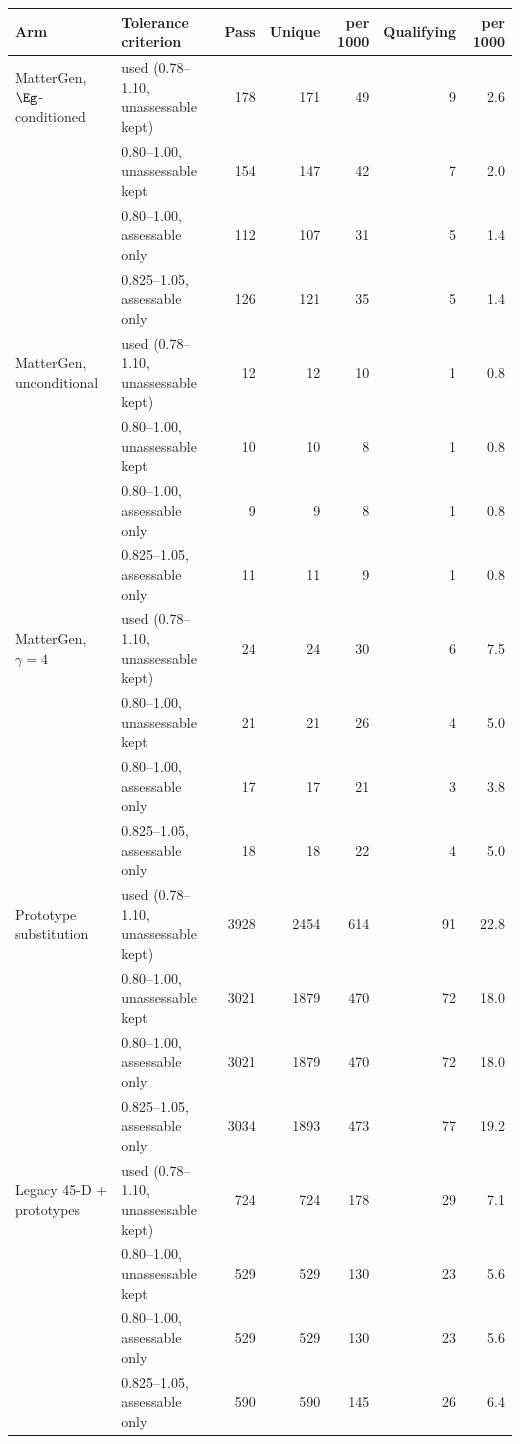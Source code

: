 \begin{tabular}{@{}llrrrrr@{}}\toprule
 Arm & Tolerance criterion & Pass & Unique & per 1000 & Qualifying & per 1000\\\midrule
MatterGen, $\Eg$-conditioned & used (0.78--1.10, unassessable kept) & 178 & 171 & 49 & 9 & 2.6 \\
 & 0.80--1.00, unassessable kept & 154 & 147 & 42 & 7 & 2.0 \\
 & 0.80--1.00, assessable only & 112 & 107 & 31 & 5 & 1.4 \\
 & 0.825--1.05, assessable only & 126 & 121 & 35 & 5 & 1.4 \\
\midrule
MatterGen, unconditional & used (0.78--1.10, unassessable kept) & 12 & 12 & 10 & 1 & 0.8 \\
 & 0.80--1.00, unassessable kept & 10 & 10 & 8 & 1 & 0.8 \\
 & 0.80--1.00, assessable only & 9 & 9 & 8 & 1 & 0.8 \\
 & 0.825--1.05, assessable only & 11 & 11 & 9 & 1 & 0.8 \\
\midrule
MatterGen, $\gamma{=}4$ & used (0.78--1.10, unassessable kept) & 24 & 24 & 30 & 6 & 7.5 \\
 & 0.80--1.00, unassessable kept & 21 & 21 & 26 & 4 & 5.0 \\
 & 0.80--1.00, assessable only & 17 & 17 & 21 & 3 & 3.8 \\
 & 0.825--1.05, assessable only & 18 & 18 & 22 & 4 & 5.0 \\
\midrule
Prototype substitution & used (0.78--1.10, unassessable kept) & 3928 & 2454 & 614 & 91 & 22.8 \\
 & 0.80--1.00, unassessable kept & 3021 & 1879 & 470 & 72 & 18.0 \\
 & 0.80--1.00, assessable only & 3021 & 1879 & 470 & 72 & 18.0 \\
 & 0.825--1.05, assessable only & 3034 & 1893 & 473 & 77 & 19.2 \\
\midrule
Legacy 45-D + prototypes & used (0.78--1.10, unassessable kept) & 724 & 724 & 178 & 29 & 7.1 \\
 & 0.80--1.00, unassessable kept & 529 & 529 & 130 & 23 & 5.6 \\
 & 0.80--1.00, assessable only & 529 & 529 & 130 & 23 & 5.6 \\
 & 0.825--1.05, assessable only & 590 & 590 & 145 & 26 & 6.4 \\
\bottomrule\end{tabular}
